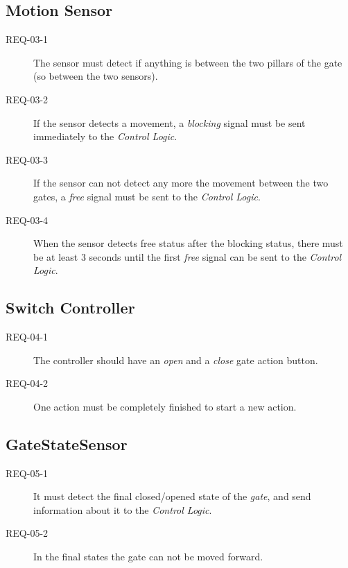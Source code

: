 \subsection{Motion Sensor}
\begin{description}
	\item [REQ-03-1] The sensor must detect if anything is between the two pillars of the gate (so between the two sensors). 
	\item [REQ-03-2] If the sensor detects a movement, a \textit{blocking} signal must be sent immediately to the \textit{Control Logic}.
	\item [REQ-03-3] If the sensor can not detect any more the movement between the two gates, a \textit{free} signal must be sent to the \textit{Control Logic}.
	\item [REQ-03-4] When the sensor detects free status after the blocking status, there must be at least 3 seconds until the first \textit{free} signal can be sent to the \textit{Control Logic}.
\end{description}

\subsection{Switch Controller}
\begin{description}
	\item [REQ-04-1] The controller should have an \textit{open} and a \textit{close} gate action button.
	\item [REQ-04-2] One action must be completely finished to start a new action. 
\end{description}

\subsection{GateStateSensor}
\begin{description}
	\item [REQ-05-1] It must detect the final closed/opened state of the \textit{gate}, and send information about it to the \textit{Control Logic}.
	\item [REQ-05-2] In the final states the gate can not be moved forward.
\end{description}

